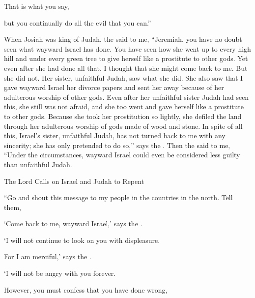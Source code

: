 {\par }{\Q That is what
you say,
\par }{\Q but you continually do
all the evil
that you can.”
\par }{\PP {}When
Josiah
was king
of Judah, the
{}
said
to
me, “Jeremiah, you have no doubt seen what
wayward
Israel
has
done.
You have seen how she went
up to
every
high
hill
and under
every
green
tree
to give herself like a prostitute
to other gods.
Yet even after
she had done
all
that, I thought
that she might come back
to me. But she did not.
Her sister,
unfaithful
Judah,
saw what she did.
She also saw
that
I gave
wayward
Israel
her divorce
papers
and sent
her away because
of her adulterous
worship of other gods. Even after her unfaithful
sister
Judah
had seen this, she still was not
afraid,
and she too
went
and gave herself like a prostitute to other gods.
Because she took her prostitution
so lightly,
she defiled
the land
through her adulterous
worship of gods made of wood
and stone.
In spite
of all
this,
Israel’s sister,
unfaithful
Judah,
has not
turned back
to me
with any
sincerity;
she has only
pretended
to do
so,” says
the {}.
Then the
{}
said
to
me, “Under the circumstances, wayward
Israel
could even be considered
less guilty than unfaithful
Judah.
\par }{\SH The Lord Calls on Israel and Judah to Repent
\par }{\PP {}“Go
and shout
this message
to my people in the countries in the north.
Tell
them,
\par }{\Q ‘Come back
to me, wayward
Israel,’
says
the {}.
\par }{\Q ‘I will not
continue to look
on you with displeasure.
\par }{\Q For
I am
merciful,’
says
the {}.
\par }{\Q ‘I will not
be angry
with you forever.
\par }{\Q {}However,
you must confess
that
you have done wrong,

}
